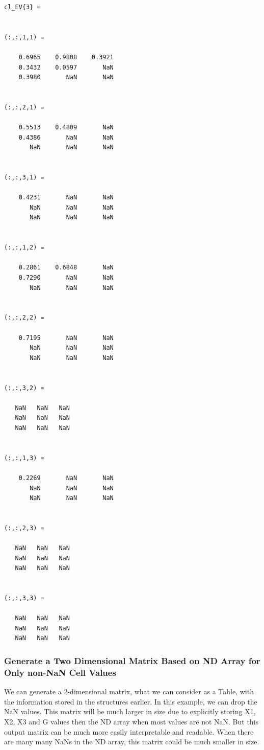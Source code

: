 \documentclass[
]{book}
\begin{document}
\begin{verbatim}
cl_EV{3} =
 

(:,:,1,1) =

    0.6965    0.9808    0.3921
    0.3432    0.0597       NaN
    0.3980       NaN       NaN


(:,:,2,1) =

    0.5513    0.4809       NaN
    0.4386       NaN       NaN
       NaN       NaN       NaN


(:,:,3,1) =

    0.4231       NaN       NaN
       NaN       NaN       NaN
       NaN       NaN       NaN


(:,:,1,2) =

    0.2861    0.6848       NaN
    0.7290       NaN       NaN
       NaN       NaN       NaN


(:,:,2,2) =

    0.7195       NaN       NaN
       NaN       NaN       NaN
       NaN       NaN       NaN


(:,:,3,2) =

   NaN   NaN   NaN
   NaN   NaN   NaN
   NaN   NaN   NaN


(:,:,1,3) =

    0.2269       NaN       NaN
       NaN       NaN       NaN
       NaN       NaN       NaN


(:,:,2,3) =

   NaN   NaN   NaN
   NaN   NaN   NaN
   NaN   NaN   NaN


(:,:,3,3) =

   NaN   NaN   NaN
   NaN   NaN   NaN
   NaN   NaN   NaN
\end{verbatim}

\hypertarget{generate-a-two-dimensional-matrix-based-on-nd-array-for-only-non-nan-cell-values}{%
\subsubsection{Generate a Two Dimensional Matrix Based on ND Array for Only non-NaN Cell Values}\label{generate-a-two-dimensional-matrix-based-on-nd-array-for-only-non-nan-cell-values}}

We can generate a 2-dimensional matrix, what we can consider as a Table,
with the information stored in the structures earlier. In this example,
we can drop the NaN values. This matrix will be much larger in size due
to explicitly storing X1, X2, X3 and G values then the ND array when
most values are not NaN. But this output matrix can be much more easily
interpretable and readable. When there are many many NaNs in the ND
array, this matrix could be much smaller in size.
\end{document}
